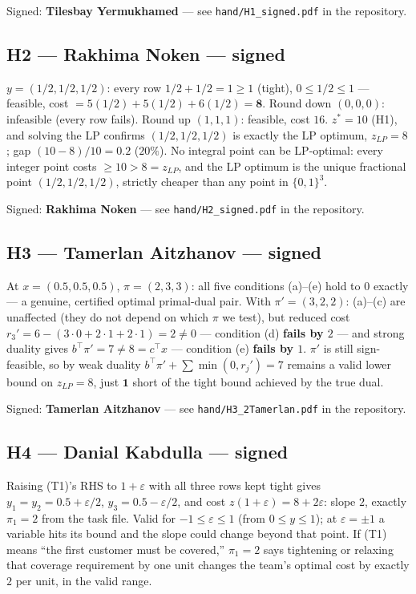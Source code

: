 \documentclass[11pt]{article}
\begin{document}
\vspace{12pt}\noindent Signed: \textbf{Tilesbay Yermukhamed} --- see \texttt{hand/H1\_signed.pdf} in the repository.

\subsection*{H2 --- Rakhima Noken --- signed}
$y=(1/2,1/2,1/2)$: every row $1/2+1/2=1\ge1$ (tight), $0\le1/2\le1$ --- feasible, cost
$=5(1/2)+5(1/2)+6(1/2)=\mathbf{8}$. Round down $(0,0,0)$: infeasible (every row fails). Round up
$(1,1,1)$: feasible, cost $16$. $z^\ast=10$ (H1), and solving the LP confirms $(1/2,1/2,1/2)$ is
exactly the LP optimum, $z_{LP}=8$; gap $(10-8)/10=\mathbf{0.2}$ ($20\%$). No integral point can be
LP-optimal: every integer point costs $\ge10>8=z_{LP}$, and the LP optimum is the unique fractional
point $(1/2,1/2,1/2)$, strictly cheaper than any point in $\{0,1\}^3$.

\vspace{12pt}\noindent Signed: \textbf{Rakhima Noken} --- see \texttt{hand/H2\_signed.pdf} in the repository.

\subsection*{H3 --- Tamerlan Aitzhanov --- signed}
At $x=(0.5,0.5,0.5)$, $\pi=(2,3,3)$: all five conditions (a)--(e) hold to $0$ exactly --- a
genuine, certified optimal primal-dual pair. With $\pi'=(3,2,2)$: (a)--(c) are unaffected (they do
not depend on which $\pi$ we test), but reduced cost $r_3'=6-(3\cdot0+2\cdot1+2\cdot1)=2\ne0$
--- condition (d) \textbf{fails by $2$} --- and strong duality gives $b^\top\pi'=7\ne8=c^\top x$
--- condition (e) \textbf{fails by $1$}. $\pi'$ is still sign-feasible, so by weak duality
$b^\top\pi'+\sum\min(0,r_j')=7$ remains a valid lower bound on $z_{LP}=8$, just $\mathbf{1}$ short
of the tight bound achieved by the true dual.

\vspace{12pt}\noindent Signed: \textbf{Tamerlan Aitzhanov} --- see \texttt{hand/H3\_2Tamerlan.pdf} in the repository.

\subsection*{H4 --- Danial Kabdulla --- signed}
Raising (T1)'s RHS to $1+\varepsilon$ with all three rows kept tight gives
$y_1=y_2=0.5+\varepsilon/2$, $y_3=0.5-\varepsilon/2$, and cost
$z(1+\varepsilon)=8+2\varepsilon$: slope $2$, exactly $\pi_1=2$ from the task file. Valid for
$-1\le\varepsilon\le1$ (from $0\le y\le1$); at $\varepsilon=\pm1$ a variable hits its bound and the
slope could change beyond that point. If (T1) means ``the first customer must be covered,''
$\pi_1=2$ says tightening or relaxing that coverage requirement by one unit changes the team's
optimal cost by exactly $2$ per unit, in the valid range.
\end{document}
